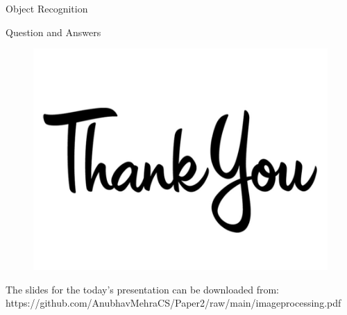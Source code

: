 \documentclass[12pt]{beamer}
\begin{document}
\begin{frame}{Object Recognition}

\end{frame}
\begin{frame}{Question and Answers}
\begin{figure}
\begin{center}
\includegraphics[scale=0.2]{thank.jpg}
\end{center}
\end{figure}
The slides for the today's presentation can be downloaded from: \\
\tiny
https://github.com/AnubhavMehraCS/Paper2/raw/main/imageprocessing.pdf
\end{frame}
\end{document}
